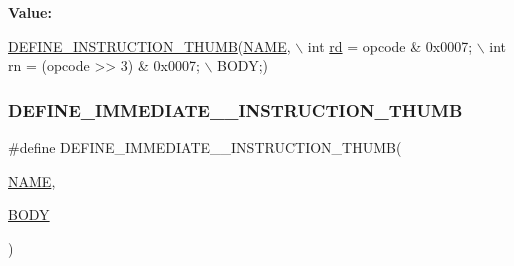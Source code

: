 {\bfseries Value\+:}
\begin{DoxyCode}
\mbox{\hyperlink{isa-thumb_8c_aca0a4c9b536fe9f14f89105945cfeb3d}{DEFINE\_INSTRUCTION\_THUMB}}(\mbox{\hyperlink{inflate_8h_a164ea0159d5f0b5f12a646f25f99eceaa67bc2ced260a8e43805d2480a785d312}{NAME}}, \(\backslash\)
        \textcolor{keywordtype}{int} \mbox{\hyperlink{isa-arm_8c_a555541ce18ed9b5fad657a06b22cb465}{rd}} = opcode & 0x0007; \(\backslash\)
        int rn = (opcode >> 3) & 0x0007; \(\backslash\)
        BODY;)
\end{DoxyCode}
\mbox{\label{isa-thumb_8c_a15901896db15b9151d225d7725df9a91}} 
\subsubsection{\texorpdfstring{D\+E\+F\+I\+N\+E\+\_\+\+I\+M\+M\+E\+D\+I\+A\+T\+E\+\_\+\_\+\+I\+N\+S\+T\+R\+U\+C\+T\+I\+O\+N\+\_\+\+T\+H\+U\+MB}{DEFINE\_IMMEDIATE\_5\_INSTRUCTION\_THUMB}}
{\footnotesize\ttfamily \#define D\+E\+F\+I\+N\+E\+\_\+\+I\+M\+M\+E\+D\+I\+A\+T\+E\+\_\+\_\+\+I\+N\+S\+T\+R\+U\+C\+T\+I\+O\+N\+\_\+\+T\+H\+U\+MB(\begin{DoxyParamCaption}\item[{}]{\mbox{\hyperlink{inflate_8h_a164ea0159d5f0b5f12a646f25f99eceaa67bc2ced260a8e43805d2480a785d312}{N\+A\+ME}},  }\item[{}]{\mbox{\hyperlink{gzlog_8c_aa6bdf6a6d9916c343e1e17774d84a156}{B\+O\+DY}} }\end{DoxyParamCaption})}

